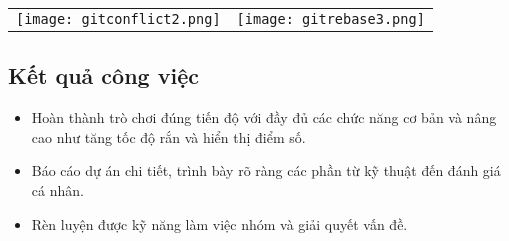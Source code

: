 \documentclass[a4paper, 12pt]{article}
\begin{document}
\begin{table}[h]
    \centering
    \begin{tabular}{c c}
         \texttt{[image: gitconflict2.png]} & \texttt{[image: gitrebase3.png]} \\
    \end{tabular}
\end{table}

\subsection{Kết quả công việc}
\begin{itemize}
    \item Hoàn thành trò chơi đúng tiến độ với đầy đủ các chức năng cơ bản và nâng cao như tăng tốc độ rắn và hiển thị điểm số.
    \item Báo cáo dự án chi tiết, trình bày rõ ràng các phần từ kỹ thuật đến đánh giá cá nhân.
    \item Rèn luyện được kỹ năng làm việc nhóm và giải quyết vấn đề.
\end{itemize}

\end{document}
